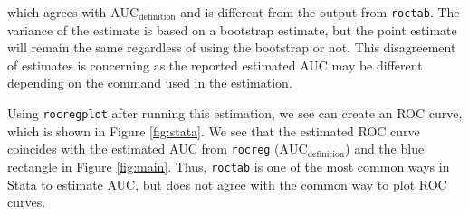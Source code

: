 \documentclass[smallextended]{svjour3}       %
\begin{document}
which agrees with \(\text{AUC}_{\text{definition}}\) and is different
from the output from \texttt{roctab}. The variance of the estimate is
based on a bootstrap estimate, but the point estimate will remain the
same regardless of using the bootstrap or not. This disagreement of
estimates is concerning as the reported estimated AUC may be different
depending on the command used in the estimation.

Using \texttt{rocregplot} after running this estimation, we see can
create an ROC curve, which is shown in Figure \ref{fig:stata}. We see
that the estimated ROC curve coincides with the estimated AUC from
\texttt{rocreg} (\(\text{AUC}_{\text{definition}}\)) and the blue
rectangle in Figure \ref{fig:main}. Thus, \texttt{roctab} is one of the
most common ways in Stata to estimate AUC, but does not agree with the
common way to plot ROC curves.
\end{document}
